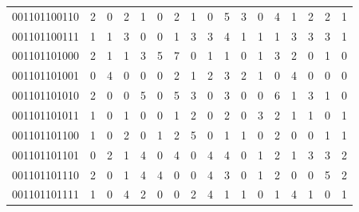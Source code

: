 \documentclass[10pt,a4paper]{article}
\begin{document}
\begin{longtable}{ |c|c|c|c|c|c|c|c|c|c|c|c|c|c|c|c|c| }
    001101100110              & 2                            & 0                                & 2                            & 1                              & 0   & 2   & 1   & 0   & 5   & 3   & 0   & 4   & 1   & 2   & 2   & 1   \\
    001101100111              & 1                            & 1                                & 3                            & 0                              & 0   & 1   & 3   & 3   & 4   & 1   & 1   & 1   & 3   & 3   & 3   & 1   \\
    001101101000              & 2                            & 1                                & 1                            & 3                              & 5   & 7   & 0   & 1   & 1   & 0   & 1   & 3   & 2   & 0   & 1   & 0   \\
    001101101001              & 0                            & 4                                & 0                            & 0                              & 0   & 2   & 1   & 2   & 3   & 2   & 1   & 0   & 4   & 0   & 0   & 0   \\
    001101101010              & 2                            & 0                                & 0                            & 5                              & 0   & 5   & 3   & 0   & 3   & 0   & 0   & 6   & 1   & 3   & 1   & 0   \\
    001101101011              & 1                            & 0                                & 1                            & 0                              & 0   & 1   & 2   & 0   & 2   & 0   & 3   & 2   & 1   & 1   & 0   & 1   \\
    001101101100              & 1                            & 0                                & 2                            & 0                              & 1   & 2   & 5   & 0   & 1   & 1   & 0   & 2   & 0   & 0   & 1   & 1   \\
    001101101101              & 0                            & 2                                & 1                            & 4                              & 0   & 4   & 0   & 4   & 4   & 0   & 1   & 2   & 1   & 3   & 3   & 2   \\
    001101101110              & 2                            & 0                                & 1                            & 4                              & 4   & 0   & 0   & 4   & 3   & 0   & 1   & 2   & 0   & 0   & 5   & 2   \\
    001101101111              & 1                            & 0                                & 4                            & 2                              & 0   & 0   & 2   & 4   & 1   & 1   & 0   & 1   & 4   & 1   & 0   & 1   \\

\end{longtable}
\end{document}
